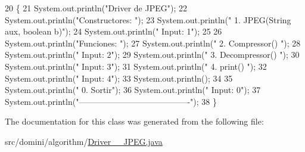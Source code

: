 \begin{DoxyCode}
20                                      \{
21         System.out.println(\textcolor{stringliteral}{"Driver de JPEG"});
22         System.out.println(\textcolor{stringliteral}{"Constructores: "});
23         System.out.println(\textcolor{stringliteral}{"     1. JPEG(String aux, boolean b)"});
24         System.out.println(\textcolor{stringliteral}{"     Input: 1"});
25 
26         System.out.println(\textcolor{stringliteral}{"Funciones: "});
27         System.out.println(\textcolor{stringliteral}{"     2. Compressor() "});
28         System.out.println(\textcolor{stringliteral}{"     Input: 2"});
29         System.out.println(\textcolor{stringliteral}{"     3. Decompressor() "});
30         System.out.println(\textcolor{stringliteral}{"     Input: 3"});
31         System.out.println(\textcolor{stringliteral}{"     4. print() "});
32         System.out.println(\textcolor{stringliteral}{"     Input: 4"});
33         System.out.println();
34 
35         System.out.println(\textcolor{stringliteral}{"     0. Sortir"});
36         System.out.println(\textcolor{stringliteral}{"     Input: 0"});
37         System.out.println(\textcolor{stringliteral}{"----------------------------------------"});
38     \}
\end{DoxyCode}


The documentation for this class was generated from the following file\+:\begin{DoxyCompactItemize}
\item 
src/domini/algorithm/\hyperlink{Driver____JPEG_8java}{Driver\+\_\+\+\_\+\+J\+P\+E\+G.\+java}\end{DoxyCompactItemize}
